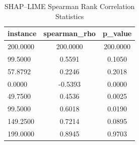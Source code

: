 \begin{table}
\centering
\caption{SHAP–LIME Spearman Rank Correlation Statistics}
\label{tab:agreement}
\begin{tabular}{lcc}
\toprule
instance & spearman_rho & p_value \\
\midrule
200.0000 & 200.0000 & 200.0000 \\
99.5000 & 0.5591 & 0.1050 \\
57.8792 & 0.2246 & 0.2018 \\
0.0000 & -0.5393 & 0.0000 \\
49.7500 & 0.4536 & 0.0025 \\
99.5000 & 0.6018 & 0.0190 \\
149.2500 & 0.7214 & 0.0895 \\
199.0000 & 0.8945 & 0.9703 \\
\bottomrule
\end{tabular}
\end{table}

